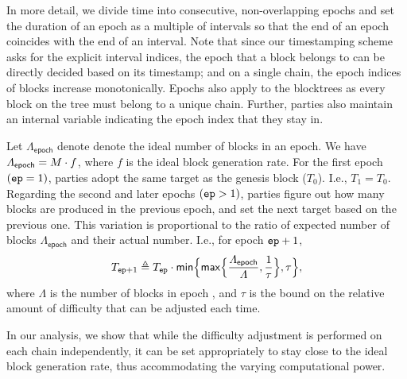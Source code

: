 In more detail, we divide time into consecutive, non-overlapping epochs and set the duration \epochLen of an epoch as a multiple of intervals so that the end of an epoch coincides with the end of an interval.
%
Note that since our timestamping scheme asks for the explicit interval indices, the epoch that a block belongs to can be directly decided based on its timestamp; and on a single chain, the epoch indices of blocks increase monotonically.
%
Epochs also apply to the blocktrees as every block on the tree must belong to a unique chain.
%
Further, parties also maintain an internal variable \epoch indicating the epoch index that they stay in.

Let $\varLambda_{\mathsf{epoch}}$ denote denote the ideal number of blocks in an epoch.
%
We have $\varLambda_{\mathsf{epoch}} = M \cdot f$, where $f$ is the ideal block generation rate.
%
For the first epoch $(\mathtt{ep} = 1)$, parties adopt the same target as
the genesis block ($T_0$).
%
I.e., $T_1 = T_0$.
%
Regarding the second and later epochs $(\mathtt{ep} > 1)$, parties figure out how many blocks are produced in the previous epoch, and set the next target based on the previous one.
%
This variation is proportional to the ratio of expected number of blocks $\varLambda_{\mathsf{epoch}}$ and their actual number.
%
I.e., for epoch $\mathtt{ep} + 1$,
%
\begin{equation} \label{eq:target-recalc}
      T_{\mathtt{ep} + 1} \triangleq T_{\mathtt{ep}} \cdot  \mathsf{min} \Big\{ \mathsf{max} \Big\{ \frac{\varLambda_{\mathsf{epoch}}}{\varLambda}, \frac{1}{\tau} \Big\}, \tau \Big\},
\end{equation}
%
where $\varLambda$ is the number of blocks in epoch \epoch, and $\tau$ is the bound on the relative amount of difficulty that can be adjusted each time.

In our analysis, we show that while the difficulty adjustment is performed on each chain independently, it can be set appropriately to stay close to the ideal block generation rate, thus accommodating the varying computational power.
